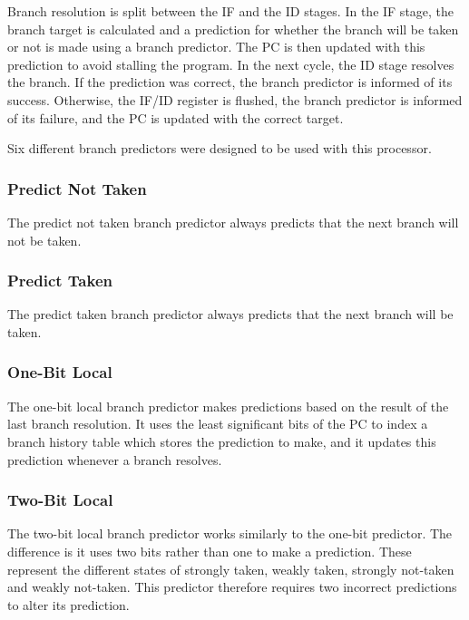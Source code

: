 \documentclass[conference, hidelinks]{IEEEtran}
\begin{document}
Branch resolution is split between the IF and the ID stages. In the IF stage, the branch target is calculated and a prediction for whether the branch will be taken or not is made using a branch predictor. The PC is then updated with this prediction to avoid stalling the program. In the next cycle, the ID stage resolves the branch. If the prediction was correct, the branch predictor is informed of its success. Otherwise, the IF/ID register is flushed, the branch predictor is informed of its failure, and the PC is updated with the correct target.

Six different branch predictors were designed to be used with this processor.

\subsubsection{Predict Not Taken}

The predict not taken branch predictor always predicts that the next branch will not be taken.

\subsubsection{Predict Taken}

The predict taken branch predictor always predicts that the next branch will be taken.

\subsubsection{One-Bit Local}

The one-bit local branch predictor makes predictions based on the result of the last branch resolution. It uses the least significant bits of the PC to index a branch history table which stores the prediction to make, and it updates this prediction whenever a branch resolves.

\subsubsection{Two-Bit Local}

The two-bit local branch predictor works similarly to the one-bit predictor. The difference is it uses two bits rather than one to make a prediction. These represent the different states of strongly taken, weakly taken, strongly not-taken and weakly not-taken. This predictor therefore requires two incorrect predictions to alter its prediction.
\end{document}
